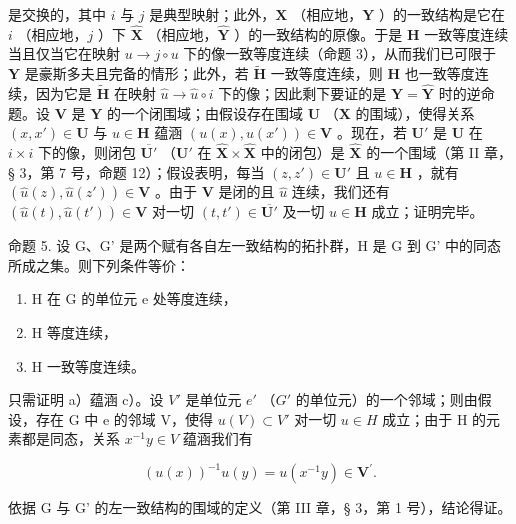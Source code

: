 是交换的，其中 \(i\) 与 \(j\) 是典型映射；此外，\(\mathbf{X}\) （相应地，\(\mathbf{Y}\) ）的一致结构是它在 \(i\) （相应地，\(j\) ）下 \(\hat{\mathbf{X}}\) （相应地，\(\hat{\mathbf{Y}}\) ）的一致结构的原像。于是 \(\mathbf{H}\) 一致等度连续当且仅当它在映射 \(u \to j \circ u\) 下的像一致等度连续（命题 3），从而我们已可限于 \(\mathbf{Y}\) 是豪斯多夫且完备的情形；此外，若 \(\tilde{\mathbf{H}}\) 一致等度连续，则 \(\mathbf{H}\) 也一致等度连续，因为它是 \(\tilde{\mathbf{H}}\) 在映射 \(\hat{u} \to \hat{u} \circ i\) 下的像；因此剩下要证的是 \(\mathbf{Y} = \hat{\mathbf{Y}}\) 时的逆命题。设 \(\mathbf{V}\) 是 \(\mathbf{Y}\) 的一个闭围域；由假设存在围域 \(\mathbf{U}\) （\(\mathbf{X}\) 的围域），使得关系 \((x, x') \in \mathbf{U}\) 与 \(u \in \mathbf{H}\) 蕴涵 \((u(x), u(x')) \in \mathbf{V}\) 。现在，若 \(\mathbf{U}'\) 是 \(\mathbf{U}\) 在 \(i \times i\) 下的像，则闭包 \(\overline{\mathbf{U}'}\) （\(\mathbf{U}'\) 在 \(\hat{\mathbf{X}} \times \hat{\mathbf{X}}\) 中的闭包）是 \(\hat{\mathbf{X}}\) 的一个围域（第 II 章，§ 3，第 7 号，命题 12）；假设表明，每当 \((z, z') \in \mathbf{U}'\) 且 \(u \in \mathbf{H}\) ，就有 \((\hat{u}(z), \hat{u}(z')) \in \mathbf{V}\) 。由于 \(\mathbf{V}\) 是闭的且 \(\hat{u}\) 连续，我们还有 \((\hat{u}(t), \hat{u}(t')) \in \mathbf{V}\) 对一切 \((t, t') \in \overline{\mathbf{U}'}\) 及一切 \(u \in \mathbf{H}\) 成立；证明完毕。

命题 5. 设 G、G' 是两个赋有各自左一致结构的拓扑群，H 是 G 到 G' 中的同态所成之集。则下列条件等价：

\begin{enumerate}
\def\labelenumi{\alph{enumi})}
\item
  H 在 G 的单位元 e 处等度连续，
\item
  H 等度连续，
\item
  H 一致等度连续。
\end{enumerate}

只需证明 a）蕴涵 c）。设 \(V'\) 是单位元 \(e'\) （\(G'\) 的单位元）的一个邻域；则由假设，存在 G 中 e 的邻域 V，使得 \(u(V) \subset V'\) 对一切 \(u \in H\) 成立；由于 H 的元素都是同态，关系 \(x^{-1}y \in V\) 蕴涵我们有

\[
(u (x)) ^ {- 1} u (y) = u (x ^ {- 1} y) \in \mathbf {V} ^ {\prime}.
\]

依据 G 与 G' 的左一致结构的围域的定义（第 III 章，§ 3，第 1 号），结论得证。

